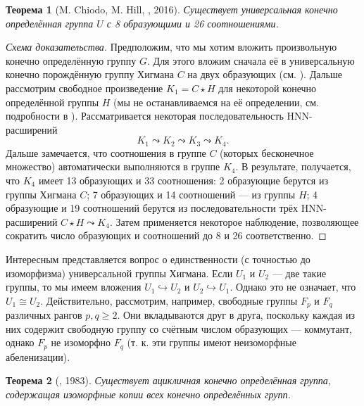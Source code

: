 \documentclass[14pt, dvipsnames, twoside]{extarticle}
\newtheorem{theorem}{Теорема}
\theoremstyle{definition}
\theoremstyle{remark}
\begin{document}
\begin{theorem}[M. Chiodo, M. Hill, \cite{ExplicityPresentation}, 2016]\label{ExplicityPresentation}
Существует универсальная конечно определённая группа $U$ с 8 образующими и 26 соотношениями.  
\end{theorem}

\begin{proof}[Схема доказательства]

Предположим, что мы хотим вложить произвольную конечно определённую группу $G$. Для этого вложим сначала её в универсальную конечно порождённую группу Хигмана $C$ на двух образующих (см. \cite{EmbeddingTheorems}). Дальше рассмотрим свободное произведение $K_1 = C\star H$ для некоторой конечно определённой группы $H$ (мы не останавливаемся на её определении, см. подробности в \cite{ExplicityPresentation}). Рассматривается некоторая последовательность HNN-расширений $$K_1\leadsto K_2\leadsto K_3\leadsto K_4.$$ Дальше замечается, что соотношения в группе $C$ (которых бесконечное множество) автоматически выполняются в группе $K_4$. В результате, получается, что $K_4$ имеет 13 образующих и 33 соотношения: 2 образующие берутся из группы Хигмана $C$; 7 образующих и 14 соотношений --- из группы $H$; 4 образующие и 19 соотношений берутся из последовательности трёх HNN-расширений $C\star H\leadsto K_4$. Затем применяется некоторое наблюдение, позволяющее сократить число образующих и соотношений до 8 и 26 соответственно.  

\end{proof}  

Интересным представляется вопрос о единственности (с точностью до изоморфизма) универсальной группы Хигмана. Если $U_1$ и $U_2$ --- две такие группы, то мы имеем вложения $U_1\hookrightarrow U_2$ и $U_2\hookrightarrow U_1$. Однако это не означает, что $U_1\cong U_2$. Действительно, рассмотрим, например, свободные группы  $F_p$ и $F_q$ различных рангов $p, q\geqslant 2$. Они вкладываются друг в друга, поскольку каждая из них содержит свободную группу со счётным числом образующих --- коммутант, однако $F_p$ не изоморфно $F_q$ (т. к. эти группы имеют неизоморфные абеленизации).   
 


\begin{theorem}[\cite{BaumslagUniversal}, 1983]\label{BousfUniv}
Существует ацикличная конечно определённая группа, содержащая изоморфные копии всех конечно определённых групп.
\end{theorem}  
\end{document}
